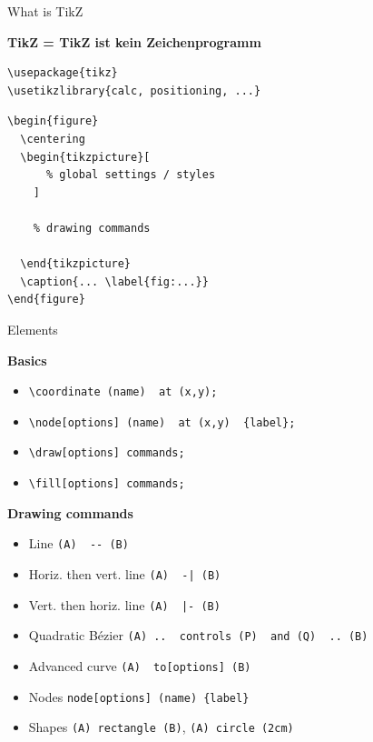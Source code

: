 \documentclass[xetex, onlymath, handout]{beamer}
\begin{document}
\begin{frame}[fragile]{What is TikZ}

{\Large\bfseries TikZ = TikZ ist kein Zeichenprogramm}
\begin{lstlisting}
\usepackage{tikz}
\usetikzlibrary{calc, positioning, ...}
\end{lstlisting}
\begin{lstlisting}
\begin{figure}
  \centering
  \begin{tikzpicture}[
      % global settings / styles
    ]

    % drawing commands

  \end{tikzpicture}
  \caption{... \label{fig:...}}
\end{figure}
\end{lstlisting}
\end{frame}

\begin{frame}[fragile]{Elements}

  {\bfseries Basics}
  \begin{itemize}
    \item \lstinline!\coordinate (name)  at (x,y);!
    \item \lstinline!\node[options] (name)  at (x,y)  {label};!
    \item \lstinline!\draw[options] commands;!
    \item \lstinline!\fill[options] commands;!
  \end{itemize}

  {\bfseries Drawing commands}
  \begin{itemize}
    \item Line \lstinline!(A)  -- (B)!
    \item Horiz. then vert. line \lstinline!(A)  -| (B)!
    \item Vert. then horiz. line \lstinline!(A)  |- (B)!
    \item Quadratic B\'ezier \lstinline!(A) ..  controls (P)  and (Q)  .. (B)!
    \item Advanced curve \lstinline!(A)  to[options] (B)!
    \item Nodes \lstinline!node[options] (name) {label}!
    \item Shapes \lstinline!(A) rectangle (B)!, \lstinline!(A) circle (2cm)!
  \end{itemize}
\end{frame}
\end{document}
